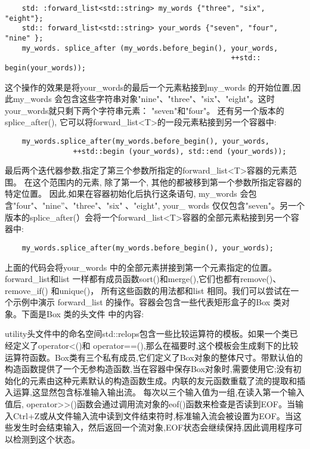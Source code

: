 \begin{verbatim}
	std: :forward_list<std::string> my_words {"three", "six", "eight"};
	std:: forward_list<std::string> your_words {"seven", "four", "nine" };
	my_words. splice_after (my_words.before_begin(), your_words,
	 												 ++std:: begin(your_words));
\end{verbatim}

这个操作的效果是将your\_words的最后一个元素粘接到my\_words 的开始位置,因此my\_words 会包含这些字符串对象"nine"、"three"、"six"、"eight"。这时your\_words就只剩下两个字符串元素： "seven"和"four"。
还有另一个版本的splice\_after(), 它可以将forward\_list<T>的一段元素粘接到另一个容器中:

\begin{verbatim}
	my_words.splice_after(my_words.before_begin(), your_words,
				++std::begin (your_words), std::end (your_words));
\end{verbatim}

最后两个迭代器参数,指定了第三个参数所指定的forward\_list<T>容器的元素范围。
在这个范围内的元素, 除了第一个, 其他的都被移到第一个参数所指定容器的特定位置。
因此,如果在容器初始化后执行这条语句, my\_words 会包含"four"、"nine”、"three"、"six"
、"eight", your\_ words 仅仅包含"seven"。另一个版本的splice\_after(）会将一个forward\_list<T>容器的全部元素粘接到另一个容器中:
\begin{verbatim}
	my_words.splice_after(my_words.before_begin(), your_words);
\end{verbatim}

上面的代码会将your\_words 中的全部元素拼接到第一个元素指定的位置。\\
forward\_list和list 一样都有成员函数sort()和merge(),它们也都有remove()、remove\_if()
和unique()， 所有这些函数的用法都和list 相同。我们可以尝试在一个示例中演示
forward\_list 的操作。容器会包含一些代表矩形盒子的Box 类对象。下面是Box 类的头文件
中的内容:



utility头文件中的命名空间std::relops包含一些比较运算符的模板。如果一个类已经定义了operator<()和 operator==(),那么在福要时,这个模板会生成剩下的比较运算符函数。Box类有三个私有成员,它们定义了Box对象的整体尺寸。带默认伯的构造函数提供了一个无参构造函数,当在容器中保存Box对象时,需要使用它;没有初始化的元素由这种元素默认的构造函数生成。内联的友元函数重载了流的提取和插入运算,这显然包含标准输入输出流。 每次以三个输入值为一组,在读入第一个输入值后, operator>>()函数会通过调用流对象的eof()函数来检查是否读到EOF。当输入Ctrl+Z或从文件输入流中读到文件结束符时,标准输入流会被设置为EOF。当这些发生时会结束输入，然后返回一个流对象,EOF状态会继续保持,因此调用程序可以检测到这个状态。

